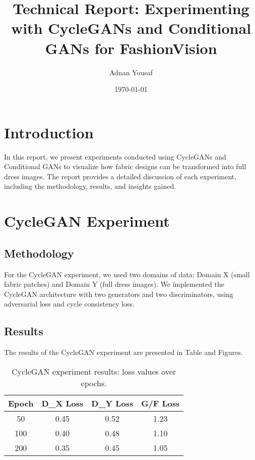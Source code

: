 \documentclass{article}
\begin{document}
\title{Technical Report: Experimenting with CycleGANs and Conditional GANs for FashionVision}
\author{Adnan Yousaf}
\date{\today}
\maketitle

\section{Introduction}
In this report, we present experiments conducted using CycleGANs and Conditional GANs to visualize how fabric designs can be transformed into full dress images. The report provides a detailed discussion of each experiment, including the methodology, results, and insights gained.

\section{CycleGAN Experiment}

\subsection{Methodology}
For the CycleGAN experiment, we used two domains of data: Domain X (small fabric patches) and Domain Y (full dress images). We implemented the CycleGAN architecture with two generators and two discriminators, using adversarial loss and cycle consistency loss.

\subsection{Results}
The results of the CycleGAN experiment are presented in Table and Figures.

\begin{table}[h]
    \centering
    \begin{tabular}{cccc}
        \toprule
        \textbf{Epoch} & \textbf{D\_X Loss} & \textbf{D\_Y Loss} & \textbf{G/F Loss} \\
        \midrule
        50 & 0.45 & 0.52 & 1.23 \\
        100 & 0.40 & 0.48 & 1.10 \\
        200 & 0.35 & 0.45 & 1.05 \\
        \bottomrule
    \end{tabular}
    \caption{CycleGAN experiment results: loss values over epochs.}
    \label{tab:cyclegan_results}
\end{table}
\end{document}
